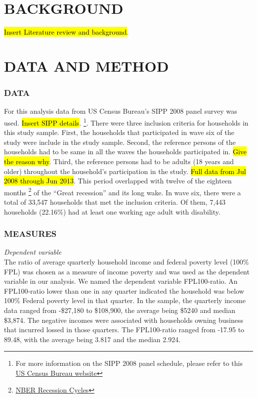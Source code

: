 \documentclass[11pt]{extarticle} %
\begin{document}
\section*{BACKGROUND}
\noindent
{\hl{Insert Literature review and background}}.

\section*{DATA AND METHOD}
\subsubsection*{DATA}
For this analysis data from US Census Bureau's SIPP 2008 panel survey was used. {\hl{Insert SIPP details}}. {\footnote{For more information on the SIPP 2008 panel schedule, please refer to this \href{http://www.census.gov/programs-surveys/sipp/data/2008-panel.html}{US Census Bureau website}}}. There were three inclusion criteria for households in this study sample. First, the households that participated in wave six of the study were include in the study sample. Second, the reference persons of the households had to be same in all the waves the households participated in. {\hl{Give the reason why}}. Third, the reference persons had to be adults (18 years and older) throughout the household's participation in the study. {\hl{Full data from Jul 2008 through Jun 2013}}. This period overlapped with twelve of the eighteen months {\footnote{\href{http://www.nber.org/cycles/}{NBER Recession Cycles}}} of the ``Great recession'' and its long wake. In wave six, there were a total of 33,547 households that met the inclusion criteria. Of them, 7,443  households (22.16\%) had at least one working age adult with disability.

\subsubsection*{MEASURES}
\noindent
{\emph{Dependent variable}}\\
The ratio of average quarterly household income and federal poverty level (100\% FPL) was chosen as a measure of income poverty and was used as the dependent variable in our analysis. We named the dependent variable FPL100-ratio. An FPL100-ratio lower than one in any quarter indicated the household was below 100\% Federal poverty level in that quarter. In the sample, the quarterly income data ranged from -\$27,180 to \$108,900, the average being \$5240 and median \$3,874. The negative incomes were associated with households owning business that incurred lossed in those quarters. The FPL100-ratio ranged from -17.95 to 89.48, with the average being 3.817 and the median 2.924. 
\end{document}
